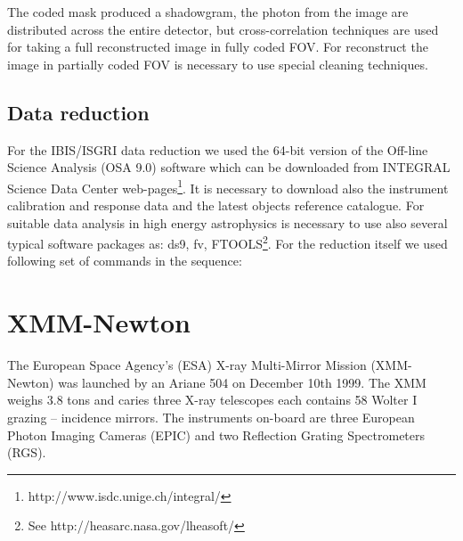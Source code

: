 \documentclass[oneside,a4paper,11pt]{report}
\begin{document}
The coded mask produced a shadowgram, the photon from the image are distributed across the entire detector, 
but cross-correlation techniques are used for taking a full reconstructed image in fully coded FOV. 
For reconstruct the image in partially coded FOV is necessary to use special cleaning techniques.

\subsection{Data reduction}
For the IBIS/ISGRI data reduction we used the 64-bit version of the Off-line Science Analysis (OSA 9.0) 
software which can be downloaded from INTEGRAL Science Data Center web-pages\footnote{http://www.isdc.unige.ch/integral/}. 
It is necessary to download also the instrument calibration and response data and the latest 
objects reference catalogue.
For suitable data analysis in high energy astrophysics is necessary to use also several 
typical software packages as: ds9, fv, FTOOLS\footnote{See http://heasarc.nasa.gov/lheasoft/}.       
For the reduction itself we used following set of commands in the sequence:



\section{XMM-Newton}
The European Space Agency's (ESA) X-ray Multi-Mirror Mission (XMM-Newton) was launched by an Ariane 504 
on December 10th 1999. The XMM weighs 3.8 tons and caries three X-ray telescopes each contains 58 Wolter I 
grazing -- incidence mirrors. The instruments on-board are three European Photon Imaging Cameras (EPIC) 
and two Reflection Grating Spectrometers (RGS).
\end{document}
